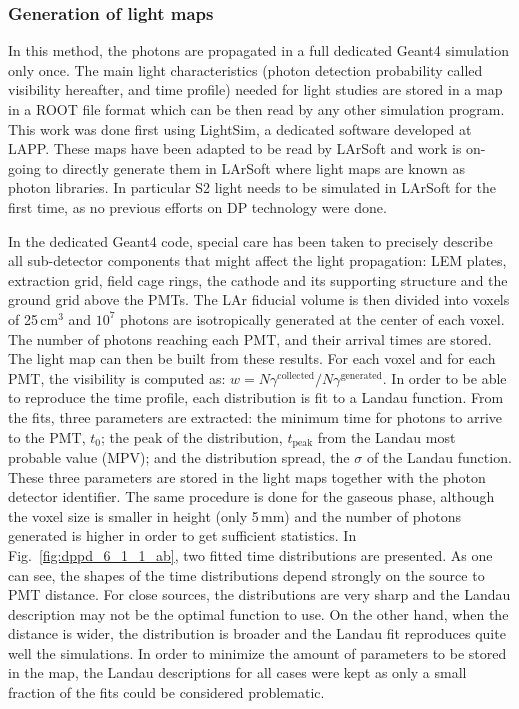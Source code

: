 \subsubsection{Generation of light maps}
\label{subsec:fddp-pd-6.1.1}

In this method, the photons are propagated in a full dedicated Geant4 simulation only once. The main light characteristics (photon detection probability called visibility hereafter, and time profile) needed for light studies are stored in a map in a ROOT \cite{root} file format which can be then read by any other simulation program. This work was done first using LightSim, a dedicated software developed at LAPP. These maps have been adapted to be read by LArSoft and work is on-going to directly generate them in LArSoft where light maps are known as photon libraries. In particular S2 light needs to be simulated in LArSoft for the first time, as no previous efforts on DP technology were done.

In the dedicated Geant4 code, special care has been taken to precisely describe all sub-detector components that might affect the light propagation: LEM plates, extraction grid, field cage rings, the cathode and its supporting structure and the ground grid above the PMTs. The LAr fiducial volume is then divided into voxels of 25\,cm$^3$ and $10^7$ photons are isotropically generated at the center of each voxel. The number of photons reaching each PMT, and their arrival times are stored. The light map can then be built from these results. For each voxel and for each PMT, the visibility is computed as: $w=N\gamma^{\textrm{collected}}/N\gamma^{\textrm{generated}}$. In order to be able to reproduce the time profile, each distribution is fit to a Landau function. From the fits, three parameters are extracted: the minimum time for photons to arrive to the PMT, $t_0$; the peak of the distribution, $t_{\textrm{peak}}$ from the Landau most probable value (MPV); and the distribution spread, the $\sigma$ of the Landau function. These three parameters are stored in the light maps together with the photon detector identifier. The same procedure is done for the gaseous phase, although the 
voxel size is smaller in height (only 5\,mm) and the number of photons generated is higher in order to get sufficient statistics. In Fig.~\ref{fig:dppd_6_1_1_ab}, two fitted time distributions are presented. As one can see, the shapes of the time distributions depend strongly on the source to PMT distance. For close sources, the distributions are very sharp and the Landau description may not be the optimal function to use. On the other hand, when the distance is wider, the distribution is broader and the Landau fit reproduces quite well the simulations. In order to minimize the amount of parameters to be stored in the map, the Landau descriptions for all cases were kept as only a small fraction of the fits could be considered problematic.

